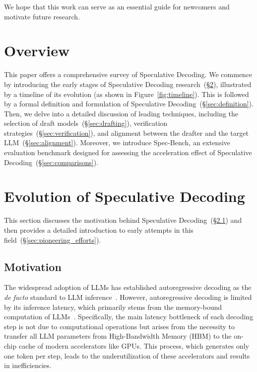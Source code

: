 We hope that this work can serve as an essential guide for newcomers and motivate future research.

\section{Overview}
This paper offers a comprehensive survey of Speculative Decoding. We commence by introducing the early stages of Speculative Decoding research~(\S\ref{sec:timeline}), illustrated by a timeline of its evolution (as shown in Figure~\ref{fig:timeline}). This is followed by a formal definition and formulation of Speculative Decoding~(\S\ref{sec:definition}). Then, we delve into a detailed discussion of leading techniques, including the selection of draft models~(\S\ref{sec:drafting}), verification strategies~(\S\ref{sec:verification}), and alignment between the drafter and the target LLM~(\S\ref{sec:alignment}). Moreover, we introduce Spec-Bench, an extensive evaluation benchmark designed for assessing the acceleration effect of Speculative Decoding~(\S\ref{sec:comparisons}).

\section{Evolution of Speculative Decoding}
\label{sec:timeline}
This section discusses the motivation behind Speculative Decoding~(\S\ref{sec:motivation}) and then provides a detailed introduction to early attempts in this field~(\S\ref{sec:pioneering_efforts}).

\subsection{Motivation}
\label{sec:motivation}
The widespread adoption of LLMs has established autoregressive decoding as the \textit{de facto} standard to LLM inference~\cite{PaLM:2023, openai:2023gpt4, jiang2024mixtral}. However, autoregressive decoding is limited by its inference latency, which primarily stems from the memory-bound computation of LLMs~\cite{Patterson:2004latencybandwith, Shazeer:2019memorybandwith}. Specifically, the main latency bottleneck of each decoding step is not due to computational operations but arises from the necessity to transfer all LLM parameters from High-Bandwidth Memory (HBM) to the on-chip cache of modern accelerators like GPUs. This process, which generates only one token per step, leads to the underutilization of these accelerators and results in inefficiencies.


